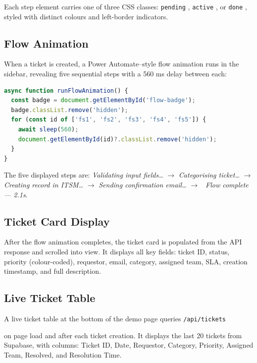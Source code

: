 \documentclass[12pt, a4paper]{article}
\newcommand{\inlinecode}[1]{%
  \colorbox{inlinecode!20}{\texttt{\small #1}}%
}
\begin{document}
Each step element carries one of three CSS classes: \inlinecode{pending},
\inlinecode{active}, or \inlinecode{done}, styled with distinct colours and
left-border indicators.

\subsection{Flow Animation}

When a ticket is created, a Power Automate--style flow animation runs in the sidebar,
revealing five sequential steps with a 560 ms delay between each:

\begin{lstlisting}[language=JavaScript, caption={Flow animation sequence}]
async function runFlowAnimation() {
  const badge = document.getElementById('flow-badge');
  badge.classList.remove('hidden');
  for (const id of ['fs1', 'fs2', 'fs3', 'fs4', 'fs5']) {
    await sleep(560);
    document.getElementById(id)?.classList.remove('hidden');
  }
}
\end{lstlisting}

The five displayed steps are:
\textit{Validating input fields\ldots} $\to$
\textit{Categorising ticket\ldots} $\to$
\textit{Creating record in ITSM\ldots} $\to$
\textit{Sending confirmation email\ldots} $\to$
\textit{\checkmark~Flow complete — 2.1s}.

\subsection{Ticket Card Display}

After the flow animation completes, the ticket card is populated from the API response
and scrolled into view. It displays all key fields: ticket ID, status, priority
(colour-coded), requestor, email, category, assigned team, SLA, creation timestamp,
and full description.

\subsection{Live Ticket Table}

A live ticket table at the bottom of the demo page queries \inlinecode{/api/tickets}
on page load and after each ticket creation. It displays the last 20 tickets from
Supabase, with columns: Ticket ID, Date, Requestor, Category, Priority, Assigned Team,
Resolved, and Resolution Time.

\end{document}
